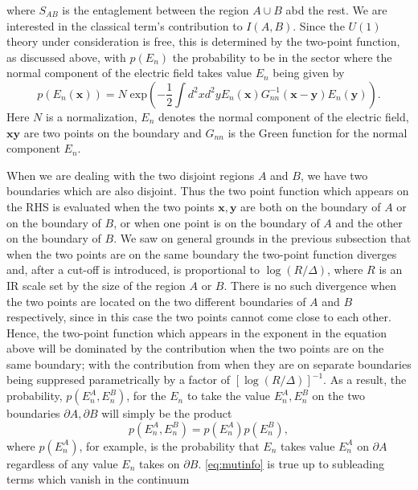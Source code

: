 where $S_{AB}$ is the entaglement between the region $A\cup B$ abd the rest. We
are interested in the classical term's contribution to $I(A,B)$. Since the
$U(1)$ theory under consideration is free, this is determined by the two-point 
function, as discussed above, with $p(E_n)$ the probability to be in the
sector where the normal component of the electric field takes value $E_n$ being
given by
\begin{equation}
  p(E_n(\mathbf{x})) = N\; \mathrm{exp}\left(-\frac{1}{2}\int d^2x d^2
  y E_n(\mathbf{x})G^{-1}_{nn}(\mathbf{x}-\mathbf{y})E_n(\mathbf{y})\right).
  \label{eq:twopointvacuum}
\end{equation}
Here $N$ is a normalization, $E_n$ denotes the normal component of the electric
field, $\mathbf{x}\mathbf{y}$ are two points on the boundary and $G_{nn}$ is
the Green function for the normal component $E_n$.
\par When we are dealing with the two disjoint regions $A$ and $B$, we have two
boundaries which are also disjoint. Thus the two point function which appears
on the RHS is evaluated when the two points $\mathbf{x},\mathbf{y}$ are both on
the boundary of $A$ or on the boundary of $B$, or when one point is on the
boundary of $A$ and the other on the boundary of $B$. We saw on general grounds
in the previous subsection that when the two points are on the same boundary
the two-point function diverges and, after a cut-off is introduced, is
proportional to $\log(R/\Delta)$, where $R$ is an IR scale set by the size
of the region $A$ or $B$. There is no such divergence when the two points
are located on the two different boundaries of $A$ and $B$ respectively, since
in this case the two points cannot come close to each other. Hence, the
two-point function which appears in the exponent in the equation above will
be dominated by the contribution when the two points are on the same boundary;
with the contribution from when they are on separate boundaries being suppresed
parametrically by a factor of $[\log(R/\Delta)]^{-1}$. As a result, the
probability, $p(E_n^A,E_n^B)$, for the $E_n$ to take the value $E_n^A, E_n^B$
on the two boundaries $\partial A, \partial B$ will simply be the product
\begin{equation}
  p(E_n^A, E_n^B) = p(E_n^A)p(E_n^B),
  \label{eq:mutinfo}
\end{equation}
where $p(E_n^A)$, for example, is the probability that $E_n$ takes value
$E_n^A$ on $\partial A$ regardless of any value $E_n$ takes on $\partial B$.
\eqref{eq:mutinfo} is true up to subleading terms which vanish in the continuum
